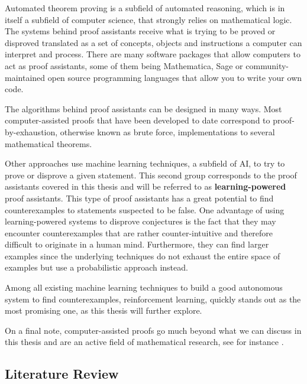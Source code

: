 \documentclass[11pt]{article}
\theoremstyle{definition}
\begin{document}
Automated theorem proving is a subfield of automated reasoning, which is in itself a subfield of computer science, that strongly relies on mathematical logic. The systems behind proof assistants receive what is trying to be proved or disproved translated as a set of concepts, objects and instructions a computer can interpret and process. There are many software packages that allow computers to act as proof assistants, some of them being Mathematica, Sage or community-maintained open source programming languages that allow you to write your own code. 


The algorithms behind proof assistants can be designed in many ways. Most computer-assisted proofs that have been developed to date correspond to proof-by-exhaustion, otherwise known as brute force, implementations to several mathematical theorems. 

Other approaches use machine learning techniques, a subfield of AI, to try to prove or disprove a given statement. This second group corresponds to the proof assistants covered in this thesis and will be referred to as \textbf{learning-powered} proof assistants. This type of proof assistants has a great potential to find counterexamples to statements suspected to be false. One advantage of using learning-powered systems to disprove conjectures is the fact that they may encounter counterexamples that are rather counter-intuitive and therefore difficult to originate in a human mind. Furthermore, they can find larger examples since the underlying techniques do not exhaust the entire space of examples but use a probabilistic approach instead.

Among all existing machine learning techniques to build a good autonomous system to find counterexamples, reinforcement learning, quickly stands out as the most promising one, as this thesis will further explore.

On a final note, computer-assisted proofs go much beyond what we can discuss in this thesis and are an active field of mathematical research, see for instance \cite{GowersBlog}.

\subsection{Literature Review}
\end{document}
